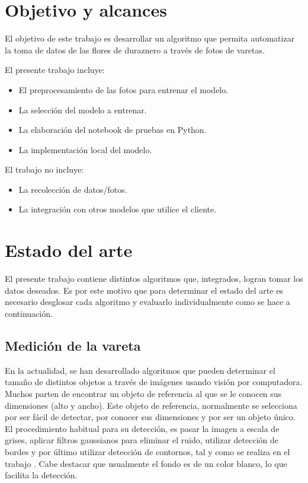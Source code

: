 \section{Objetivo y alcances}

El objetivo de este trabajo es desarrollar un algoritmo que permita automatizar la toma de datos de las flores de duraznero a través de fotos de varetas.

El presente trabajo incluye:
\begin{itemize}
	\item El preprocesamiento de las fotos para entrenar el modelo.
	\item La selección del modelo a entrenar.
	\item La elaboración del notebook de pruebas en Python.
	\item La implementación local del modelo.
\end{itemize}

El trabajo no incluye:
\begin{itemize}
	\item La recolección de datos/fotos.
	\item La integración con otros modelos que utilice el cliente.
\end{itemize}



\section{Estado del arte}

El presente trabajo contiene distintos algoritmos que, integrados, logran tomar los datos deseados. Es por este motivo que para determinar el estado del arte es necesario desglosar cada algoritmo y evaluarlo individualmente como se hace a continuación.

\subsection{Medición de la vareta}

En la actualidad, se han desarrollado algoritmos que pueden determinar el tamaño de distintos objetos a través de imágenes usando visión por computadora. Muchos parten de encontrar un objeto de referencia al que se le conocen sus dimensiones (alto y ancho). Este objeto de referencia, normalmente se selecciona por ser fácil de detectar, por conocer sus dimensiones y por ser un objeto único. El procedimiento habitual para su detección, es pasar la imagen a escala de grises, aplicar filtros gaussianos para eliminar el ruido, utilizar detección de bordes y por último utilizar detección de contornos, tal y como se realiza en el trabajo \cite{ARTICLE:2}. Cabe destacar que usualmente el fondo es de un color blanco, lo que facilita la detección.

